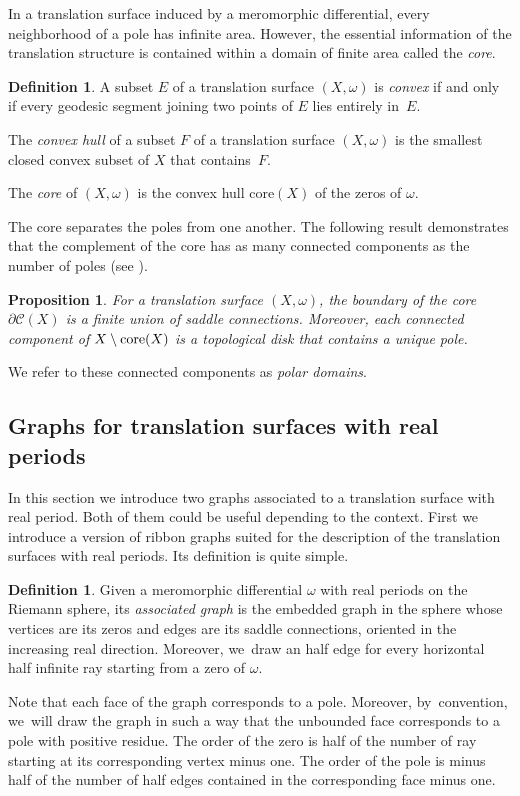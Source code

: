 \documentclass[11pt]{article}
\newcommand{\core}{\mathrm{core}}
\newtheorem{prop}[thm]{Proposition}
\theoremstyle{definition}
\newtheorem{defn}[thm]{Definition}
\begin{document}
In a translation surface induced by a meromorphic differential, every neighborhood of a pole has infinite area. However, the essential information of the translation structure is contained within a domain of finite area called the \textit{core}.

\begin{defn}\label{defn:core}
A subset $E$ of a translation surface $(X,\omega)$ is \textit{convex} if and only if every geodesic segment joining two points of $E$ lies entirely in~$E$.

The \textit{convex hull} of a subset $F$ of a translation surface $(X,\omega)$ is the smallest closed convex subset of $X$ that contains~$F$.

The \textit{core} of $(X,\omega)$ is the convex hull $\core(X)$ of the zeros of $\omega$.
\end{defn}

The core separates the poles from one another. The following result demonstrates that the complement of the core has as many connected components as the number of poles (see \cite[Prop.\,4.4 \& Lem.\,4.5]{tahar}).

\begin{prop}\label{prop:decomppoles}
For a translation surface $(X,\omega)$, the boundary of the core $\partial\mathcal{C}(X)$ is a finite union of saddle connections. Moreover, each connected component of $X \setminus\nobreak \core(X)$ is a topological disk that contains a unique pole.
\end{prop}
We refer to these connected components as \textit{polar domains}.

\subsection{Graphs for translation surfaces with real periods}\label{sub:RealGraph}
In this section we introduce two graphs associated to a translation surface with real period. Both of them could be useful depending to the context. First we introduce a version of ribbon graphs suited for the description of the translation surfaces with real periods. Its definition is quite simple.
\begin{defn}
Given a meromorphic differential $\omega$ with real periods on the Riemann sphere, its \textit{associated graph} is the embedded graph in the sphere whose vertices are its zeros and edges are its saddle connections, oriented in the increasing real direction. Moreover, we~draw an half edge for every horizontal half infinite ray starting from a zero of $\omega$.
\end{defn}
Note that each face of the graph corresponds to a pole. Moreover, by~convention, we~will draw the graph in such a way that the unbounded face corresponds to a pole with positive residue. The order of the zero is half of the number of ray starting at its corresponding vertex minus one. The order of the pole is minus half of the number of half edges contained in the corresponding face minus one.
\end{document}
